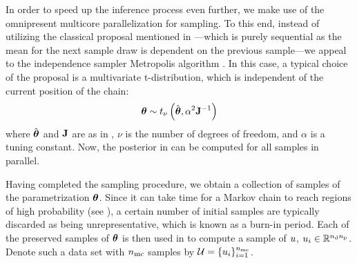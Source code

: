 In order to speed up the inference process even further, we make use of the omnipresent multicore parallelization for sampling. To this end, instead of utilizing the classical proposal mentioned in ---which is purely sequential as the mean for the next sample draw is dependent on the previous sample---we appeal to the independence sampler Metropolis algorithm \cite{gelman2004}. In this case, a typical choice of the proposal is a multivariate t-distribution, which is independent of the current position of the chain:
\begin{equation} \elabel{proposal}
  \vparam \sim \studentst{\nu}{\hat{\vparam}}{\alpha^2 \mOI^{-1}}
\end{equation}
where $\hat{{\boldsymbol\theta}}$ and $\mathbf{J}$ are as in , $\nu$ is the number of degrees of freedom, and $\alpha$ is a tuning constant. Now, the posterior in  can be computed for all samples in parallel.

Having completed the sampling procedure, we obtain a collection of samples of the parametrization ${\boldsymbol\theta}$. Since it can take time for a Markov chain to reach regions of high probability (see ), a certain number of initial samples are typically discarded as being unrepresentative, which is known as a burn-in period.
Each of the preserved samples of ${\boldsymbol\theta}$ is then used in  to compute a sample of $u$, $u_i \in \mathbb{R}^{{n_\text{d}} {n_\text{p}}}$.
Denote such a data set with ${n_\text{mc}}$ samples by $\mathcal{U} = \{ u_i \}_{i = 1}^{n_\text{mc}}$.
